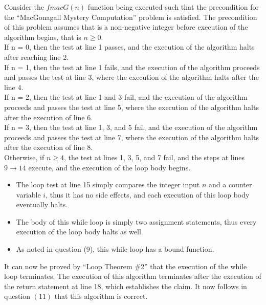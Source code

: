 \documentclass[12pt]{article}
\newenvironment{problem}[2][Problem]{\begin{trivlist}
\item[\hskip \labelsep {\bfseries #1}\hskip \labelsep {\bfseries #2.}]}{\end{trivlist}}
\begin{document}
\begin{problem}{10}
Consider the $fmacG(n)$ function being executed such that the precondition for the “MacGonagall Mystery Computation” problem is satisfied. The precondition of this problem assumes that is a non-negative integer before execution of the algorithm begins, that is $n \geq 0$. \\

\noindent
If n = 0, then the test at line 1 passes, and the execution of the algorithm halts after reaching line 2. \\

\noindent
If n = 1, then the test at line 1 fails, and the execution of the algorithm proceeds and passes the test at line 3, where the execution of the algorithm halts after the line 4. \\

\noindent
If n = 2, then the test at line 1 and 3 fail, and the execution of the algorithm proceeds and passes the test at line 5, where the execution of the algorithm halts after the execution of line 6. \\

\noindent
If n = 3, then the test at line 1, 3, and 5 fail, and the execution of the algorithm proceeds and passes the test at line 7, where the execution of the algorithm halts after the execution of line 8. \\

\noindent
Otherwise, if $n \geq 4$, the test at lines 1, 3, 5, and 7 fail, and the steps at lines $9 \rightarrow 14$ execute, and the execution of the loop body begins.

\begin{itemize}
    \item The loop test at line 15 simply compares the integer input $n$ and a counter variable $i$, thus it has no side effects, and each execution of this loop body eventually halts.
    \item The body of this while loop is simply two assignment statements, thus every execution of the loop body halts as well.
    \item As noted in question (9), this while loop has a bound function.
\end{itemize}

\noindent
It can now be proved by ``Loop Theorem \#2'' that the execution of the while loop terminates. The execution of this algorithm terminates after the execution of the return statement at line 18, which establishes the claim. It now follows in question $(11)$ that this algorithm is correct.


\end{problem}
\end{document}
